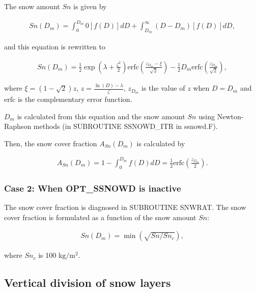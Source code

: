 The snow amount \(Sn\) is given by

\begin{eqnarray}
Sn(D_m) = \int_0^{D_m} 0[f(D)]dD + \int_{D_m}^\infty (D-D_m)[f(D)]dD, \label{8-5}
\end{eqnarray}

and this equation is rewritten to

\begin{eqnarray}
Sn(D_m)
 = \frac{1}{2} \exp{\left( \lambda + \frac{\zeta^2}{2} \right)}
 \mathrm{erfc} \left( \frac{z_{D_m}-\xi}{\sqrt{2}} \right)
 - \frac{1}{2} D_m \mathrm{erfc} \left( \frac{z_{D_m}}{\sqrt{2}} \right), \label{8-6}
\end{eqnarray}

where \(\xi = (1-\sqrt{2})z\), \(z = \frac{\ln(D)-\lambda}{\zeta}\), \(z_{D_m}\) is the value of \(z\) when \(D = D_m\) and \(\mathrm{erfc}\) is the complementary error function.

\(D_m\) is calculated from this equation and the snow amount \(Sn\) using Newton-Raphson methods (in SUBROUTINE SSNOWD\_ITR in ssnowd.F).

Then, the snow cover fraction \(A_{Sn}(D_m)\) is calculated by

\begin{eqnarray}
A_{Sn}(D_m) = 1 - \int_0^{D_m} f(D)dD = \frac{1}{2} \mathrm{erfc} \left( \frac{z_{D_m}}{2} \right). \label{8-7}
\end{eqnarray}

\hypertarget{case-2-when-opt_ssnowd-is-inactive}{%
\subsubsection{Case 2: When OPT\_SSNOWD is inactive}\label{case-2-when-opt_ssnowd-is-inactive}}

The snow cover fraction is diagnosed in SUBROUTINE SNWRAT. The snow cover fraction is formulated as a function of the snow amount \(Sn\):

\begin{eqnarray}
Sn(D_m) = \min(\sqrt{Sn/Sn_c}), \label{8-8}
\end{eqnarray}

where \(Sn_c\) is 100 \(\mathrm{kg/m^2}\).

\hypertarget{vertical-division-of-snow-layers}{%
\subsection{Vertical division of snow layers}\label{vertical-division-of-snow-layers}}


